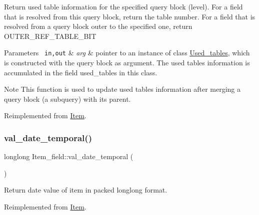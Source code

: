 Return used table information for the specified query block (level). For a field that is resolved from this query block, return the table number. For a field that is resolved from a query block outer to the specified one, return O\+U\+T\+E\+R\+\_\+\+R\+E\+F\+\_\+\+T\+A\+B\+L\+E\+\_\+\+B\+IT


\begin{DoxyParams}[1]{Parameters}
\mbox{\texttt{ in,out}}  & {\em arg} & pointer to an instance of class \mbox{\hyperlink{classUsed__tables}{Used\+\_\+tables}}, which is constructed with the query block as argument. The used tables information is accumulated in the field used\+\_\+tables in this class.\\
\hline
\end{DoxyParams}
\begin{DoxyNote}{Note}
This function is used to update used tables information after merging a query block (a subquery) with its parent. 
\end{DoxyNote}


Reimplemented from \mbox{\hyperlink{classItem_af55c5ec69663eb6a1b98f071232a7aa2}{Item}}.

\mbox{\label{classItem__field_a29fb94776a9681e8d166112f4ab2fb97}} 
\subsubsection{\texorpdfstring{val\+\_\+date\+\_\+temporal()}{val\_date\_temporal()}}
{\footnotesize\ttfamily longlong Item\+\_\+field\+::val\+\_\+date\+\_\+temporal (\begin{DoxyParamCaption}{ }\end{DoxyParamCaption})\hspace{0.3cm}{\ttfamily [virtual]}}

Return date value of item in packed longlong format. 

Reimplemented from \mbox{\hyperlink{classItem_a9174217a46706eb2db74689b5365c4a5}{Item}}.

\mbox{\label{classItem__field_a181f56468a06623d0c7399868b8fda47}} 
